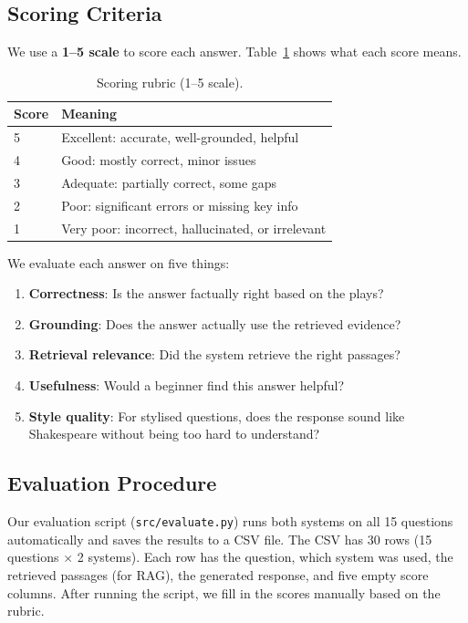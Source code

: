 \documentclass[10pt,conference]{IEEEtran}
\begin{document}
\subsection{Scoring Criteria}

We use a \textbf{1--5 scale} to score each answer. Table~\ref{tab:rubric} shows what each score means.

\begin{table}[h]
\centering
\caption{Scoring rubric (1--5 scale).}
\label{tab:rubric}
\begin{tabularx}{\linewidth}{lX}
\toprule
Score & Meaning \\
\midrule
5 & Excellent: accurate, well-grounded, helpful \\
4 & Good: mostly correct, minor issues \\
3 & Adequate: partially correct, some gaps \\
2 & Poor: significant errors or missing key info \\
1 & Very poor: incorrect, hallucinated, or irrelevant \\
\bottomrule
\end{tabularx}
\end{table}

We evaluate each answer on five things:
\begin{enumerate}
    \item \textbf{Correctness}: Is the answer factually right based on the plays?
    \item \textbf{Grounding}: Does the answer actually use the retrieved evidence?
    \item \textbf{Retrieval relevance}: Did the system retrieve the right passages?
    \item \textbf{Usefulness}: Would a beginner find this answer helpful?
    \item \textbf{Style quality}: For stylised questions, does the response sound like Shakespeare without being too hard to understand?
\end{enumerate}

\subsection{Evaluation Procedure}

Our evaluation script (\texttt{src/evaluate.py}) runs both systems on all 15 questions automatically and saves the results to a CSV file. The CSV has 30 rows (15 questions $\times$ 2 systems). Each row has the question, which system was used, the retrieved passages (for RAG), the generated response, and five empty score columns. After running the script, we fill in the scores manually based on the rubric.
\end{document}
